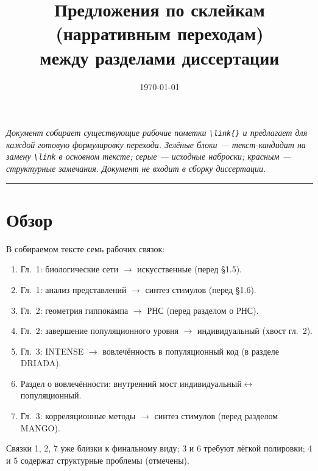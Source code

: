 \documentclass[12pt,a4paper]{article}
\title{Предложения по склейкам (нарративным переходам)\\между разделами диссертации}
\author{}
\date{\today}
\begin{document}
\maketitle

\noindent\textit{Документ собирает существующие рабочие пометки \texttt{\textbackslash link\{\}}
и предлагает для каждой готовую формулировку перехода. Зелёные блоки —
текст-кандидат на замену \texttt{\textbackslash link} в основном тексте; серые —
исходные наброски; красным — структурные замечания. Документ не входит в сборку
диссертации.}

\vspace{0.5em}\hrule\vspace{0.8em}

\section*{Обзор}
В собираемом тексте семь рабочих связок:
\begin{enumerate}[nosep]
  \item Гл.~1: биологические сети $\to$ искусственные (перед \S1.5).
  \item Гл.~1: анализ представлений $\to$ синтез стимулов (перед \S1.6).
  \item Гл.~2: геометрия гиппокампа $\to$ РНС (перед разделом о РНС).
  \item Гл.~2: завершение популяционного уровня $\to$ индивидуальный (хвост гл.~2).
  \item Гл.~3: INTENSE $\to$ вовлечённость в популяционный код (в разделе DRIADA).
  \item Раздел о вовлечённости: внутренний мост индивидуальный$\leftrightarrow$популяционный.
  \item Гл.~3: корреляционные методы $\to$ синтез стимулов (перед разделом MANGO).
\end{enumerate}
Связки 1, 2, 7 уже близки к финальному виду; 3 и 6 требуют лёгкой полировки;
4 и 5 содержат структурные проблемы (отмечены).
\end{document}
